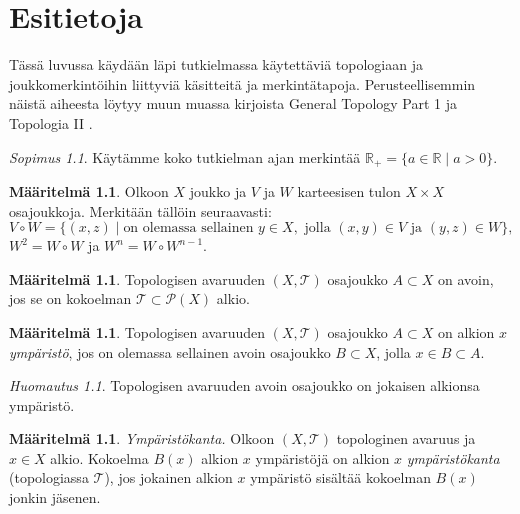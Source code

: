 \documentclass[12pt,a4paper,leqno]{report}
\newcommand{\R}{\mathbb{R}}
\newcommand{\T}{\mathcal{T}}
\newcommand{\Pot}{\mathcal{P}}
\theoremstyle{plain}
\theoremstyle{definition}
\newtheorem{maar}[equation]{Määritelmä}
\theoremstyle{remark}
\newtheorem{huom}[equation]{Huomautus}
\newtheorem{sopimus}[equation]{Sopimus}
\begin{document}
\chapter{Esitietoja}
Tässä luvussa käydään läpi tutkielmassa käytettäviä topologiaan ja joukkomerkintöihin liittyviä käsitteitä ja merkintätapoja. 
Perusteellisemmin näistä aiheesta löytyy muun muassa kirjoista General Topology Part 1 \cite{Eom1} ja Topologia II \cite{Topo2}.
\begin{sopimus}
Käytämme koko tutkielman ajan merkintää $\R_+=\{a\in\R\mid a>0\}$.
\end{sopimus}
\begin{maar}
Olkoon $X$ joukko ja $V$ ja $W$ karteesisen tulon $X\times X$ osajoukkoja.
Merkitään tällöin %
seuraavasti: 
$$V\circ W=\{(x,z)\mid \text{on olemassa sellainen }y \in X,\text{ jolla }(x,y)\in V\text{ ja }(y,z)\in W\},$$ 
$W^2=W\circ W$ ja $W^n=W\circ W^{n-1}$.
\end{maar}
\begin{maar}
Topologisen avaruuden $(X,\T)$ osajoukko $A\subset X$ on avoin, 
jos se on kokoelman $\T\subset\Pot(X)$ alkio.
\end{maar}
\begin{maar}%
Topologisen avaruuden $(X,\T)$ 
osa\-jouk\-ko $A\subset X$ on alkion $x$ \emph{ympäristö}, 
jos on olemassa sellainen avoin osajoukko $B\subset X $, jolla $x\in B\subset A$.
\end{maar}
\begin{huom}
Topologisen avaruuden avoin osajoukko on 
jokaisen alkionsa ympäristö.
\end{huom}
\begin{maar}%
\emph{Ympäristökanta.} 
Olkoon $(X,\T)$ topologinen avaruus ja $x\in X$ alkio. 
Kokoelma $B(x)$ alkion $x$ ympäristöjä on alkion $x$ \emph{ympäristökanta} 
(topologiassa $\T$), jos jokainen alkion $x$ ympäristö sisältää 
kokoelman $B(x)$ jonkin jäsenen. 
\end{maar}
\end{document}
